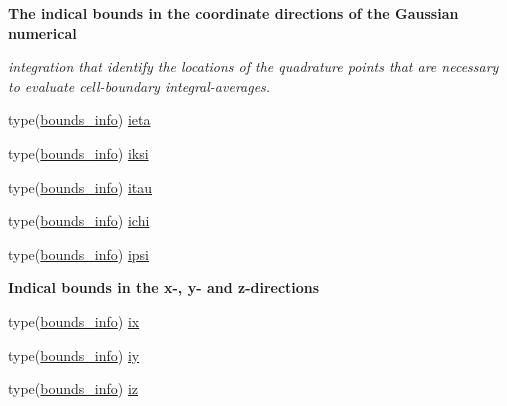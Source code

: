 \begin{Indent}\textbf{ The indical bounds in the coordinate directions of the Gaussian numerical}\par
{\em integration that identify the locations of the quadrature points that are necessary to evaluate cell-\/boundary integral-\/averages. }\begin{DoxyCompactItemize}
\item 
type(\hyperlink{structm__derived__types_1_1bounds__info}{bounds\+\_\+info}) \hyperlink{namespacem__rhs_a806c4c0942bfd830bb0b8b6276258d01}{ieta}
\item 
type(\hyperlink{structm__derived__types_1_1bounds__info}{bounds\+\_\+info}) \hyperlink{namespacem__rhs_a6b5d4a4e84fc5b93c1a13151ae398cc6}{iksi}
\item 
type(\hyperlink{structm__derived__types_1_1bounds__info}{bounds\+\_\+info}) \hyperlink{namespacem__rhs_afa742a72b96bfdbfa7d4ed2702f9d5f1}{itau}
\item 
type(\hyperlink{structm__derived__types_1_1bounds__info}{bounds\+\_\+info}) \hyperlink{namespacem__rhs_ad2b935d288f68dbde65021da0498007d}{ichi}
\item 
type(\hyperlink{structm__derived__types_1_1bounds__info}{bounds\+\_\+info}) \hyperlink{namespacem__rhs_ae55731ba38044366ff7ddecf95297657}{ipsi}
\end{DoxyCompactItemize}
\end{Indent}
\begin{Indent}\textbf{ Indical bounds in the x-\/, y-\/ and z-\/directions}\par
\begin{DoxyCompactItemize}
\item 
type(\hyperlink{structm__derived__types_1_1bounds__info}{bounds\+\_\+info}) \hyperlink{namespacem__rhs_a25b43c26b2e6ed431b9ec51d6af30c74}{ix}
\item 
type(\hyperlink{structm__derived__types_1_1bounds__info}{bounds\+\_\+info}) \hyperlink{namespacem__rhs_a3d9a864b60496c110f161a93eebc86c6}{iy}
\item 
type(\hyperlink{structm__derived__types_1_1bounds__info}{bounds\+\_\+info}) \hyperlink{namespacem__rhs_a83ac0b7807345a6879af324bae08c419}{iz}
\end{DoxyCompactItemize}
\end{Indent}
